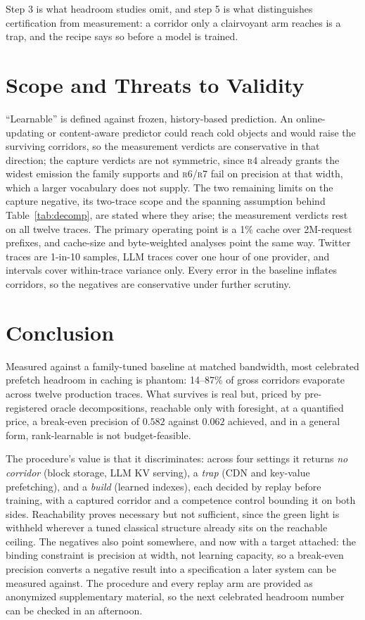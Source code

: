 \documentclass[letterpaper]{article} %
\newcommand{\rung}[1]{\textsc{#1}}
\begin{document}
\noindent Step 3 is what headroom studies omit, and step 5 is what distinguishes certification from measurement: a corridor only a clairvoyant arm reaches is a trap, and the recipe says so before a model is trained.

\section{Scope and Threats to Validity}
``Learnable'' is defined against frozen, history-based prediction. An online-updating or content-aware predictor could reach cold objects and would raise the surviving corridors, so the measurement verdicts are conservative in that direction; the capture verdicts are not symmetric, since \rung{r4} already grants the widest emission the family supports and \rung{r6}/\rung{r7} fail on precision at that width, which a larger vocabulary does not supply. The two remaining limits on the capture negative, its two-trace scope and the spanning assumption behind Table~\ref{tab:decomp}, are stated where they arise; the measurement verdicts rest on all twelve traces. The primary operating point is a 1\% cache over 2M-request prefixes, and cache-size and byte-weighted analyses point the same way. Twitter traces are 1-in-10 samples, LLM traces cover one hour of one provider, and intervals cover within-trace variance only. Every error in the baseline inflates corridors, so the negatives are conservative under further scrutiny.

\section{Conclusion}
Measured against a family-tuned baseline at matched bandwidth, most celebrated prefetch headroom in caching is phantom: 14--87\% of gross corridors evaporate across twelve production traces. What survives is real but, priced by pre-registered oracle decompositions, reachable only with foresight, at a quantified price, a break-even precision of $0.582$ against $0.062$ achieved, and in a general form, rank-learnable is not budget-feasible.

The procedure's value is that it discriminates: across four settings it returns \emph{no corridor} (block storage, LLM KV serving), a \emph{trap} (CDN and key-value prefetching), and a \emph{build} (learned indexes), each decided by replay before training, with a captured corridor and a competence control bounding it on both sides. Reachability proves necessary but not sufficient, since the green light is withheld wherever a tuned classical structure already sits on the reachable ceiling. The negatives also point somewhere, and now with a target attached: the binding constraint is precision at width, not learning capacity, so a break-even precision converts a negative result into a specification a later system can be measured against. The procedure and every replay arm are provided as anonymized supplementary material, so the next celebrated headroom number can be checked in an afternoon.


\end{document}
